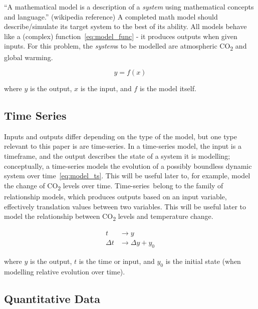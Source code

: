 \documentclass{mcmthesis}
\begin{document}
    ``A mathematical model is a description of a \textit{system} using mathematical concepts and language.'' (wikipedia reference) A completed math model should describe/simulate it\textquotesingle s target system to the best of its ability. All models behave like a (complex) function~\eqref{eq:model_func} - it produces outputs when given inputs. For this problem, the \textit{system}s to be modelled are atmospheric CO\textsubscript{2} and global warming.

    \begin{equation}
        y = f(x)
        \label{eq:model_func}
    \end{equation}

    \noindent where $y$ is the output, $x$ is the input, and $f$ is the model itself.


    \subsection{Time Series}

    Inputs and outputs differ depending on the type of the model, but one type relevant to this paper is are time-series\textquotesingle . In a time-series model, the input is a timeframe, and the output describes the state of a system it is modelling; conceptually, a time-series models the evolution of a possibly boundless dynamic system over time~\eqref{eq:model_ts}. This will be useful later to, for example, model the change of CO\textsubscript{2} levels over time. Time-series\textquotesingle~belong to the family of relationship models, which produces outputs based on an input variable, effectively translation values between two variables. This will be useful later to model the relationship between CO\textsubscript{2} levels and temperature change.

    \begin{equation}
        \begin{aligned}
            t & \rightarrow y \\
            \Delta t & \rightarrow \Delta y + y_0
        \end{aligned}
        \label{eq:model_ts}
    \end{equation}

    \noindent where $y$ is the output, $t$ is the time or input, and $y_0$ is the initial state (when modelling relative evolution over time).


    \subsection{Quantitative Data}
\end{document}

